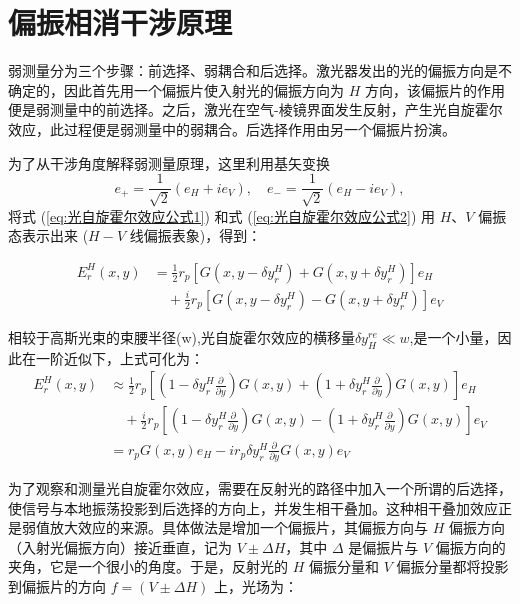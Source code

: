 \documentclass[12pt]{ctexart}
\numberwithin{equation}{section} %
\begin{document}
    \section{偏振相消干涉原理}
    弱测量分为三个步骤：前选择、弱耦合和后选择。激光器发出的光的偏振方向是不确定的，因此首先用一个偏振片使入射光的偏振方向为 $H$ 方向，该偏振片的作用便是弱测量中的前选择。之后，激光在空气-棱镜界面发生反射，产生光自旋霍尔效应，此过程便是弱测量中的弱耦合。后选择作用由另一个偏振片扮演。
    
    为了从干涉角度解释弱测量原理，这里利用基矢变换 
    \[
    e_{+} = \frac{1}{\sqrt{2}}(e_{H} + ie_{V}), \quad e_{-} = \frac{1}{\sqrt{2}}(e_{H} - ie_{V}),
    \] 
    将式 (\ref{eq:光自旋霍尔效应公式1}) 和式 (\ref{eq:光自旋霍尔效应公式2}) 用 $H$、$V$ 偏振态表示出来 ($H-V$ 线偏振表象)，得到：
    
    \begin{align*}
    E_{r}^{H}(x,y) &= \frac{1}{2} r_{p} \left[G(x,y-\delta y_{r}^{H}) + G(x,y+\delta y_{r}^{H})\right] e_{H} \\
    &\quad + \frac{i}{2} r_{p} \left[G(x,y-\delta y_{r}^{H}) - G(x,y+\delta y_{r}^{H})\right] e_{V}
    \end{align*}

    相较于高斯光束的束腰半径(w),光自旋霍尔效应的横移量$\delta y_H^{re}\ll w$,是一个小量，因此在一阶近似下，上式可化为：
    \begin{align*}
        E_{r}^{H}(x,y) & \approx \frac{1}{2} r_{p} \left[ \left( 1 - \delta y_{r}^{H} \frac{\partial}{\partial y} \right) G(x,y) + \left( 1 + \delta y_{r}^{H} \frac{\partial}{\partial y} \right) G(x,y) \right] e_{H} \\
        & \quad + \frac{i}{2} r_{p} \left[ \left( 1 - \delta y_{r}^{H} \frac{\partial}{\partial y} \right) G(x,y) - \left( 1 + \delta y_{r}^{H} \frac{\partial}{\partial y} \right) G(x,y) \right] e_{V} \\
        & = r_{p} G(x,y) e_{H} - i r_{p} \delta y_{r}^{H} \frac{\partial}{\partial y} G(x,y) e_{V}
        \end{align*}
    
        为了观察和测量光自旋霍尔效应，需要在反射光的路径中加入一个所谓的后选择，使信号与本地振荡投影到后选择的方向上，并发生相干叠加。这种相干叠加效应正是弱值放大效应的来源。具体做法是增加一个偏振片，其偏振方向与 $H$ 偏振方向（入射光偏振方向）接近垂直，记为 $V \pm \Delta H$，其中 $\Delta$ 是偏振片与 $V$ 偏振方向的夹角，它是一个很小的角度。于是，反射光的 $H$ 偏振分量和 $V$ 偏振分量都将投影到偏振片的方向 $f=(V \pm \Delta H)$ 上，光场为：
\end{document}
